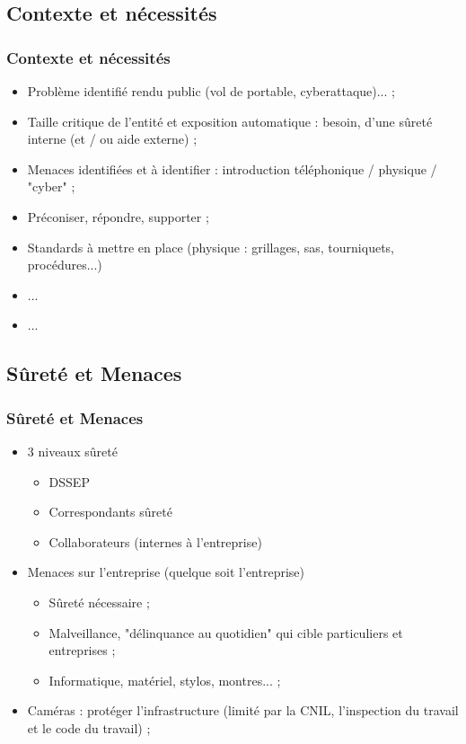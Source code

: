 \documentclass[slidetop,11pt]{beamer}
\begin{document}
\subsection{Contexte et n{\'e}cessit{\'e}s}
\begin{frame}
	\frametitle{Contexte et n{\'e}cessit{\'e}s}
	\begin{itemize}
		\item Probl{\`e}me identifi{\'e} rendu public (vol de portable, cyberattaque)... ; 
		\item Taille critique de l'entit{\'e} et exposition automatique : besoin, d'une s{\^u}ret{\'e} interne (et / ou aide externe) ; 
		\item Menaces identifi{\'e}es et {\`a} identifier : introduction t{\'e}l{\'e}phonique / physique / "cyber" ; 
		\item Pr{\'e}coniser, r{\'e}pondre, supporter ; 
		\item Standards {\`a} mettre en place (physique : grillages, sas, tourniquets, proc{\'e}dures...)
		\item ...
		\item ...
	\end{itemize}
\end{frame}

\subsection{S{\^u}ret{\'e} et Menaces}
\begin{frame}
	\frametitle{S{\^u}ret{\'e} et Menaces}
	\begin{itemize}
		\item 3 niveaux s{\^u}ret{\'e}
		\begin{itemize}
			\item DSSEP
			\item Correspondants s{\^u}ret{\'e}
			\item Collaborateurs (internes {\`a} l'entreprise)
		\end{itemize}
		\item Menaces sur l'entreprise (quelque soit l'entreprise)
		\begin{itemize}
			\item S{\^u}ret{\'e} n{\'e}cessaire ; 
			\item Malveillance, "d{\'e}linquance au quotidien" qui cible particuliers et entreprises ; 
			\item Informatique, mat{\'e}riel, stylos, montres... ; 
		\end{itemize}
		\item Cam{\'e}ras : prot{\'e}ger l'infrastructure (limit{\'e} par la CNIL, l'inspection du travail et le code du travail) ; 
	\end{itemize}
\end{frame}
\end{document}

